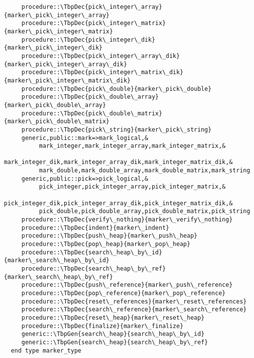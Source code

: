 \begin{Verbatim}
     procedure::\TbpDec{pick\_integer\_array}{marker\_pick\_integer\_array}
     procedure::\TbpDec{pick\_integer\_matrix}{marker\_pick\_integer\_matrix}
     procedure::\TbpDec{pick\_integer\_dik}{marker\_pick\_integer\_dik}
     procedure::\TbpDec{pick\_integer\_array\_dik}{marker\_pick\_integer\_array\_dik}
     procedure::\TbpDec{pick\_integer\_matrix\_dik}{marker\_pick\_integer\_matrix\_dik}
     procedure::\TbpDec{pick\_double}{marker\_pick\_double}
     procedure::\TbpDec{pick\_double\_array}{marker\_pick\_double\_array}
     procedure::\TbpDec{pick\_double\_matrix}{marker\_pick\_double\_matrix}
     procedure::\TbpDec{pick\_string}{marker\_pick\_string}
     generic,public::mark=>mark_logical,&
          mark_integer,mark_integer_array,mark_integer_matrix,&
          mark_integer_dik,mark_integer_array_dik,mark_integer_matrix_dik,&
          mark_double,mark_double_array,mark_double_matrix,mark_string
     generic,public::pick=>pick_logical,&
          pick_integer,pick_integer_array,pick_integer_matrix,&
          pick_integer_dik,pick_integer_array_dik,pick_integer_matrix_dik,&
          pick_double,pick_double_array,pick_double_matrix,pick_string
     procedure::\TbpDec{verify\_nothing}{marker\_verify\_nothing}
     procedure::\TbpDec{indent}{marker\_indent}
     procedure::\TbpDec{push\_heap}{marker\_push\_heap}
     procedure::\TbpDec{pop\_heap}{marker\_pop\_heap}
     procedure::\TbpDec{search\_heap\_by\_id}{marker\_search\_heap\_by\_id}
     procedure::\TbpDec{search\_heap\_by\_ref}{marker\_search\_heap\_by\_ref}
     procedure::\TbpDec{push\_reference}{marker\_push\_reference}
     procedure::\TbpDec{pop\_reference}{marker\_pop\_reference}
     procedure::\TbpDec{reset\_references}{marker\_reset\_references}
     procedure::\TbpDec{search\_reference}{marker\_search\_reference}
     procedure::\TbpDec{reset\_heap}{marker\_reset\_heap}
     procedure::\TbpDec{finalize}{marker\_finalize}
     generic::\TbpGen{search\_heap}{search\_heap\_by\_id}
     generic::\TbpGen{search\_heap}{search\_heap\_by\_ref}
  end type marker_type
\end{Verbatim}
